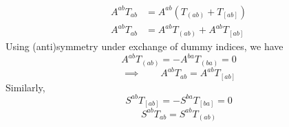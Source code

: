 \documentclass[12pt]{article}
\begin{document}
    \subsubsection{} { \begin{align*}
        A^{ab}T_{ab} & =  A^{ab}(T_{(ab)} + T_{[ab]})     \\
        A^{ab}T_{ab} & =  A^{ab}T_{(ab)} + A^{ab}T_{[ab]}
    \end{align*}}
    Using (anti)symmetry under exchange of dummy indices, we have \[A^{ab}T_{(ab)} =  -A^{ba}T_{(ba)} = 0\]
    \begin{equation*}
        \implies\qquad A^{ab}T_{ab} = A^{ab}T_{[ab]}
    \end{equation*}
    Similarly,
    \begin{equation*}
        S^{ab}T_{[ab]} = -S^{ba}T_{[ba]} = 0
    \end{equation*}
    \begin{equation*}
        S^{ab}T_{ab} = S^{ab}T_{(ab)}
    \end{equation*}
\end{document}

